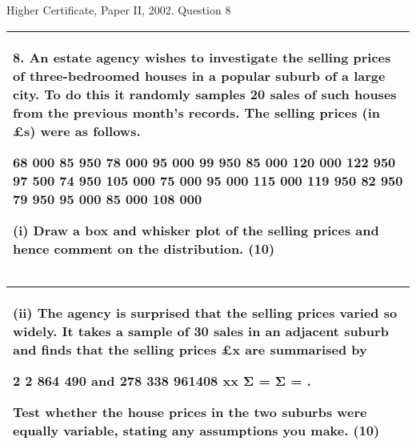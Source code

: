 \documentclass[a4paper,12pt]{article}
\begin{document}
Higher Certificate, Paper II, 2002.  Question 8 
\begin{table}[ht!]
 
\centering
 
\begin{tabular}{|p{15cm}|}
 
\hline  


8. An estate agency wishes to investigate the selling prices of three-bedroomed houses in a popular suburb of a large city.  To do this it randomly samples 20 sales of such houses from the previous month's records.  The selling prices (in £s) were as follows. 
 
  68 000   85 950   78 000   95 000   99 950   85 000 120 000 122 950   97 500   74 950 105 000   75 000   95 000 115 000 119 950   82 950   79 950   95 000   85 000 108 000 
 
 
(i) Draw a box and whisker plot of the selling prices and hence comment on the distribution. (10) 
\\ \hline
  
\end{tabular}

\end{table}

\begin{table}[ht!]
 
\centering
 
\begin{tabular}{|p{15cm}|}
 
\hline  
  
(ii) The agency is surprised that the selling prices varied so widely.  It takes a sample of 30 sales in an adjacent suburb and finds that the selling prices £x are summarised by 
 
  2 2 864 490 and 278 338 961408 xx Σ = Σ = . 
 
Test whether the house prices in the two suburbs were equally variable, stating any assumptions you make. (10) 
 
 
 
\\ \hline
  
\end{tabular}

\end{table} 
 
\end{document}
